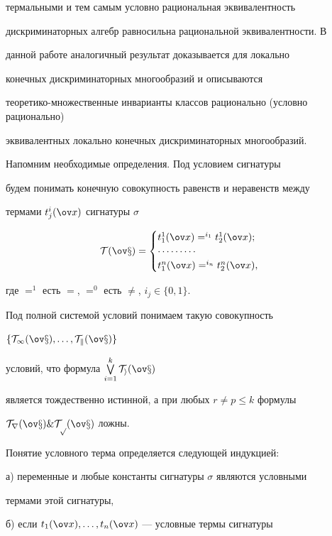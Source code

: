 термальными и тем самым условно рациональная эквивалентность


дискриминаторных алгебр равносильна рациональной эквивалентности. В


данной работе аналогичный результат доказывается для локально


конечных  дискриминаторных многообразий и описываются


теоретико-множественные инварианты классов рационально (условно рационально)


эквивалентных локально конечных дискриминаторных многообразий.





Напомним необходимые определения. Под условием сигнатуры


будем понимать конечную совокупность равенств и неравенств между


термами $t_j^i(\x)$ сигнатуры $\sigma$


$$


\T(\x)=\begin{cases}


t^1_1(\x)=^{i_1} t^1_2(\x); \\


\dotsb\dotsb\dotsb \\


t^n_1(\x)=^{i_n} t^n_2(\x),


\end{cases}


$$


где $=^1$ есть $=$,\; $=^0$ есть $\ne$, $i_j \in \{0,1\}$.


Под полной системой условий понимаем такую совокупность


$\{ \T_1(\x),\dotsc,\T_k(\x)\}$


условий, что формула $\bigvee\limits_{i=1}^{k} \T_i(\x)$


является тождественно истинной, а при любых $r\not=p\leq k$ формулы


$\T_r(\x)\&\T_p(\x)$ ложны.


Понятие условного терма определяется следующей индукцией:





а) переменные и любые константы сигнатуры $\sigma$ являются условными


термами этой сигнатуры,





б) если $t_1(\x),\dotsc,t_n(\x)$ --- условные термы сигнатуры


